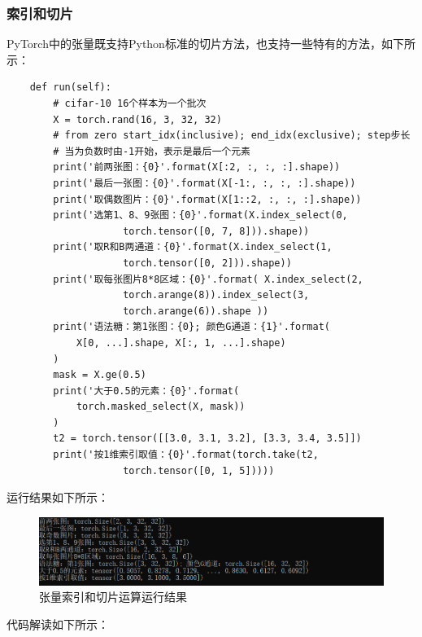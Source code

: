 \documentclass[UTF8]{article}
\begin{document}
\subsubsection{索引和切片}
PyTorch中的张量既支持Python标准的切片方法，也支持一些特有的方法，如下所示：
\begin{lstlisting}
    def run(self):
        # cifar-10 16个样本为一个批次
        X = torch.rand(16, 3, 32, 32)
        # from zero start_idx(inclusive); end_idx(exclusive); step步长
        # 当为负数时由-1开始，表示是最后一个元素
        print('前两张图：{0}'.format(X[:2, :, :, :].shape))
        print('最后一张图：{0}'.format(X[-1:, :, :, :].shape))
        print('取偶数图片：{0}'.format(X[1::2, :, :, :].shape))
        print('选第1、8、9张图：{0}'.format(X.index_select(0, 
                    torch.tensor([0, 7, 8])).shape))
        print('取R和B两通道：{0}'.format(X.index_select(1, 
                    torch.tensor([0, 2])).shape))
        print('取每张图片8*8区域：{0}'.format( X.index_select(2, 
                    torch.arange(8)).index_select(3, 
                    torch.arange(6)).shape ))
        print('语法糖：第1张图：{0}; 颜色G通道：{1}'.format(
            X[0, ...].shape, X[:, 1, ...].shape)
        )
        mask = X.ge(0.5)
        print('大于0.5的元素：{0}'.format(
            torch.masked_select(X, mask))
        )
        t2 = torch.tensor([[3.0, 3.1, 3.2], [3.3, 3.4, 3.5]])
        print('按1维索引取值：{0}'.format(torch.take(t2, 
                    torch.tensor([0, 1, 5]))))
\end{lstlisting}
运行结果如下所示：
\begin{figure}[H]
	\caption{张量索引和切片运算运行结果}
	\label{f000008}
	\centering
	\includegraphics[width=15cm]{images/f000008}
\end{figure}
代码解读如下所示：
\end{document}
